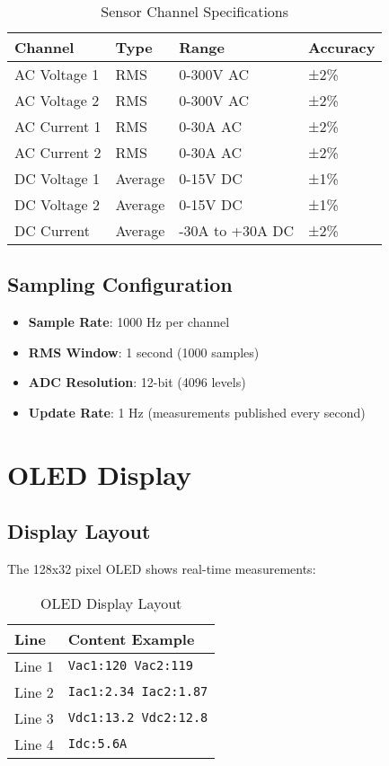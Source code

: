 \documentclass[11pt,a4paper]{article}
\begin{document}
\begin{table}[H]
\centering
\begin{tabular}{@{}llll@{}}
\toprule
Channel & Type & Range & Accuracy \\ \midrule
AC Voltage 1 & RMS & 0-300V AC & ±2\% \\
AC Voltage 2 & RMS & 0-300V AC & ±2\% \\
AC Current 1 & RMS & 0-30A AC & ±2\% \\
AC Current 2 & RMS & 0-30A AC & ±2\% \\
DC Voltage 1 & Average & 0-15V DC & ±1\% \\
DC Voltage 2 & Average & 0-15V DC & ±1\% \\
DC Current & Average & -30A to +30A DC & ±2\% \\ \bottomrule
\end{tabular}
\caption{Sensor Channel Specifications}
\end{table}

\subsection{Sampling Configuration}
\begin{itemize}
    \item \textbf{Sample Rate}: 1000 Hz per channel
    \item \textbf{RMS Window}: 1 second (1000 samples)
    \item \textbf{ADC Resolution}: 12-bit (4096 levels)
    \item \textbf{Update Rate}: 1 Hz (measurements published every second)
\end{itemize}

\section{OLED Display}

\subsection{Display Layout}
The 128x32 pixel OLED shows real-time measurements:

\begin{table}[H]
\centering
\begin{tabular}{@{}ll@{}}
\toprule
Line & Content Example \\ \midrule
Line 1 & \texttt{Vac1:120  Vac2:119} \\
Line 2 & \texttt{Iac1:2.34  Iac2:1.87} \\
Line 3 & \texttt{Vdc1:13.2 Vdc2:12.8} \\
Line 4 & \texttt{Idc:5.6A} \\ \bottomrule
\end{tabular}
\caption{OLED Display Layout}
\end{table}
\end{document}
